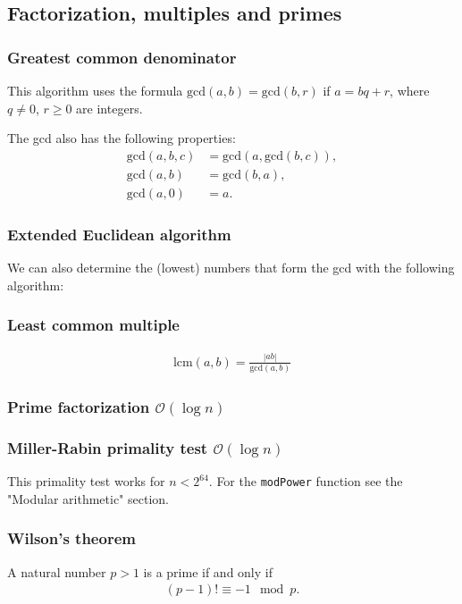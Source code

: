 \subsection{Factorization, multiples and primes}

\subsubsection{Greatest common denominator}
This algorithm uses the formula $\text{gcd}(a,b) = \text{gcd}(b,r)$ if $a = bq + r$, where $q \neq 0$, $r \geq 0$ are integers.

The gcd also has the following properties:
\begin{align*}
    \text{gcd}(a, b, c) &= \text{gcd}(a, \text{gcd}(b, c)), \\
    \text{gcd}(a, b) &= \text{gcd}(b, a), \\
    \text{gcd}(a, 0) &= a.
\end{align*}

\subsubsection{Extended Euclidean algorithm}
We can also determine the (lowest) numbers that form the gcd with the following algorithm:

\subsubsection{Least common multiple}
\begin{align*}
    \text{lcm}(a, b) = \frac{|ab|}{\text{gcd}(a, b)}
\end{align*}

\subsubsection{Prime factorization $\mathcal O(\log n)$}

\subsubsection{Miller-Rabin primality test $\mathcal O(\log n)$}
This primality test works for $n < 2^{64}$. For the \texttt{modPower} function see the "Modular arithmetic" section.

\subsubsection{Wilson's theorem}
A natural number $p > 1$ is a prime if and only if
\begin{align*}
    (p - 1)! \equiv -1 \mod p.
\end{align*}

